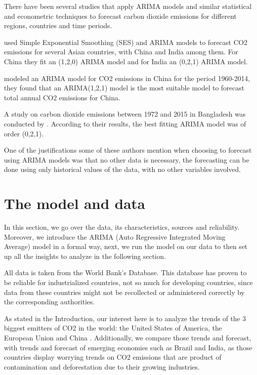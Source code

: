 \documentclass[
]{article}
\begin{document}
There have been several studies that apply ARIMA models and similar
statistical and econometric techniques to forecast carbon dioxide
emissions for different regions, countries and time periods.

\citet{fatima2019forecasting} used Simple Exponential Smoothing (SES)
and ARIMA models to forecast CO2 emissions for several Asian countries,
with China and India among them. For China they fit an (1,2,0) ARIMA
model and for India an (0,2,1) ARIMA model.

\citet{nyoni2019modeling} modeled an ARIMA model for CO2 emissions in
China for the period 1960-2014, they found that an ARIMA(1,2,1) model is
the most suitable model to forecast total annual CO2 emissions for
China.

A study on carbon dioxide emissions between 1972 and 2015 in Bangladesh
was conducted by \citet{rahman2017modeling}. According to their results,
the best fitting ARIMA model was of order (0,2,1).

One of the justifications some of these authors mention when choosing to
forecast using ARIMA models was that no other data is necessary, the
forecasting can be done using only historical values of the data, with
no other variables involved.

\hypertarget{the-model-and-data}{%
\section{The model and data}\label{the-model-and-data}}

In this section, we go over the data, its characteristics, sources and
reliability. Moreover, we introduce the ARIMA (Auto Regressive
Integrated Moving Average) model in a formal way, next, we run the model
on our data to then set up all the insights to analyze in the following
section.

All data is taken from the World Bank's Database. This database has
proven to be reliable for industrialized countries, not so much for
developing countries, since data from these countries might not be
recollected or administered correctly by the corresponding authorities.

As stated in the Introduction, our interest here is to analyze the
trends of the 3 biggest emitters of CO2 in the world: the United States
of America, the European Union and China . Additionally, we compare
those trends and forecast, with trends and forecast of emerging
economies such as Brazil and India, as those countries display worrying
trends on CO2 emissions that are product of contamination and
deforestation due to their growing industries.
\end{document}
